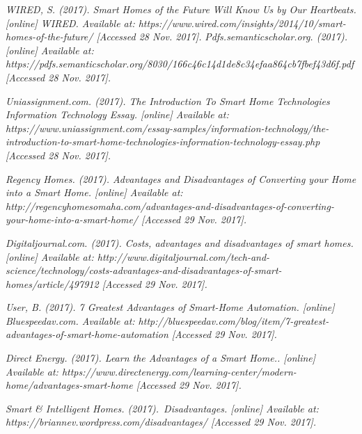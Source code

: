 \documentclass[report]{IEEEtran}
\begin{document}
\begin{thebibliography}{1}
\emph{WIRED, S. (2017). Smart Homes of the Future Will Know Us by Our Heartbeats. [online] WIRED. Available at: https://www.wired.com/insights/2014/10/smart-homes-of-the-future/ [Accessed 28 Nov. 2017].}
\emph{Pdfs.semanticscholar.org. (2017). [online] Available at: https://pdfs.semanticscholar.org/8030/166c46c14d1de8c34efaa864cb7fbef43d6f.pdf [Accessed 28 Nov. 2017].}

\emph{ Uniassignment.com. (2017). The Introduction To Smart Home Technologies Information Technology Essay. [online] Available at: https://www.uniassignment.com/essay-samples/information-technology/the-introduction-to-smart-home-technologies-information-technology-essay.php [Accessed 28 Nov. 2017].}

\emph{Regency Homes. (2017). Advantages and Disadvantages of Converting your Home into a Smart Home. [online] Available at: http://regencyhomesomaha.com/advantages-and-disadvantages-of-converting-your-home-into-a-smart-home/ [Accessed 29 Nov. 2017].}

\emph{Digitaljournal.com. (2017). Costs, advantages and disadvantages of smart homes. [online] Available at: http://www.digitaljournal.com/tech-and-science/technology/costs-advantages-and-disadvantages-of-smart-homes/article/497912 [Accessed 29 Nov. 2017].}

\emph{User, B. (2017). 7 Greatest Advantages of Smart-Home Automation. [online] Bluespeedav.com. Available at: http://bluespeedav.com/blog/item/7-greatest-advantages-of-smart-home-automation [Accessed 29 Nov. 2017].}

\emph{Direct Energy. (2017). Learn the Advantages of a Smart Home.. [online] Available at: https://www.directenergy.com/learning-center/modern-home/advantages-smart-home [Accessed 29 Nov. 2017].}

\emph{Smart & Intelligent Homes. (2017). Disadvantages. [online] Available at: https://briannev.wordpress.com/disadvantages/ [Accessed 29 Nov. 2017].}
\end{thebibliography}
\end{document}
